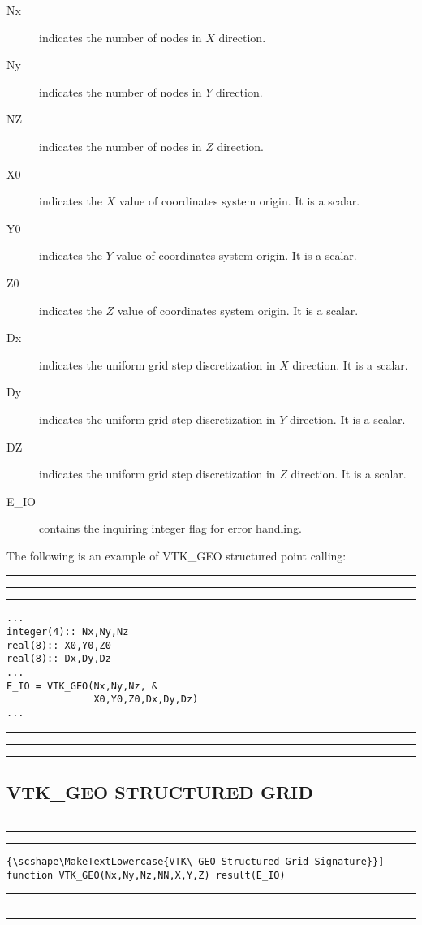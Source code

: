 \documentclass[pagesize=pdftex,fontsize=10pt,paper=a4,oneside]{scrbook}
\DeclareRobustCommand{\MarginNote}[1]{\marginpar{%
\slshape\footnotesize%
\parindent=0pt\lineskip=0pt\lineskiplimit=0pt%
\tolerance=2000\hyphenpenalty=300\exhyphenpenalty=300%
\doublehyphendemerits=100000\finalhyphendemerits=\doublehyphendemerits%
\raggedright\hspace{0pt}#1}}
\newenvironment{boxred}[1]%
               {%
                \noindent\hspace*{-0.025\textwidth}%
                \color{Maroon}%
                \rule[-5.8pt]{0.6pt}{6pt}\hspace*{-0.6pt}\rule{1.05\textwidth}{0.6pt}\hspace*{-0.6pt}\rule[-5.8pt]{0.6pt}{6pt}%
                \color{black}%
                \vspace*{0.6pt}\MarginNote{\color{Maroon}{#1}}%
               }%
               {%
                \noindent\hspace*{-0.025\textwidth}%
                \color{Maroon}%
                \rule[0pt]{0.6pt}{6pt}\hspace*{-0.6pt}\rule{1.05\textwidth}{0.6pt}\hspace*{-0.6pt}\rule[0pt]{0.6pt}{6pt}%
                \color{black}%
                \vspace*{2mm}%
               }
\DeclareRobustCommand{\MaiuscolettoBS}[1]{\textls[80]{\scshape\MakeTextLowercase{#1}}}
\begin{document}
\begin{description}
 \item[{\color{RoyalBlue}Nx}] indicates the number of nodes in $X$ direction.
 \item[{\color{RoyalBlue}Ny}] indicates the number of nodes in $Y$ direction.
 \item[{\color{RoyalBlue}NZ}] indicates the number of nodes in $Z$ direction.
 \item[{\color{RoyalBlue}X0}] indicates the $X$ value of coordinates system origin. It is a scalar.
 \item[{\color{RoyalBlue}Y0}] indicates the $Y$ value of coordinates system origin. It is a scalar.
 \item[{\color{RoyalBlue}Z0}] indicates the $Z$ value of coordinates system origin. It is a scalar.
 \item[{\color{RoyalBlue}Dx}] indicates the uniform grid step discretization in $X$ direction. It is a scalar.
 \item[{\color{RoyalBlue}Dy}] indicates the uniform grid step discretization in $Y$ direction. It is a scalar.
 \item[{\color{RoyalBlue}DZ}] indicates the uniform grid step discretization in $Z$ direction. It is a scalar.
 \item[{\color{RoyalBlue}E\_IO}] contains the inquiring integer flag for error handling.
\end{description}

The following is an example of VTK\_GEO structured point calling:

\begin{boxred}{VTK\_GEO Structured Points Calling}
\begin{verbatim}
...
integer(4):: Nx,Ny,Nz
real(8):: X0,Y0,Z0
real(8):: Dx,Dy,Dz
...
E_IO = VTK_GEO(Nx,Ny,Nz, &
               X0,Y0,Z0,Dx,Dy,Dz)
...
\end{verbatim}
\end{boxred}

\subsection{VTK\_GEO STRUCTURED GRID}

\begin{boxred}{}
\begin{lstlisting}[style=signature,title=\color{Maroon}\MaiuscolettoBS{VTK\_GEO Structured Grid Signature}]
function VTK_GEO(Nx,Ny,Nz,NN,X,Y,Z) result(E_IO)
\end{lstlisting}
\end{boxred}
\end{document}
